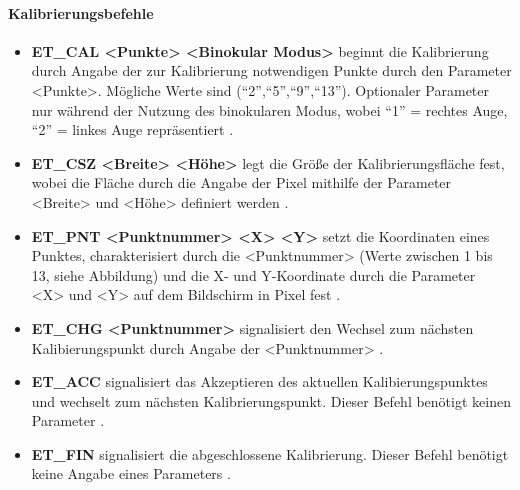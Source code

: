\paragraph{Kalibrierungsbefehle}
\begin{itemize}
\item \textbf{ET\_CAL <Punkte> <Binokular Modus>} beginnt die Kalibrierung durch Angabe der zur Kalibrierung notwendigen Punkte durch den Parameter <Punkte>. Mögliche Werte sind (\enquote{2},\enquote{5},\enquote{9},\enquote{13}). Optionaler Parameter nur während der Nutzung des binokularen Modus, wobei \enquote{1} = rechtes Auge, \enquote{2} = linkes Auge repräsentiert \cite[S.489-490]{SMI2011}.
\item \textbf{ET\_CSZ <Breite> <Höhe>} legt die Größe der Kalibrierungsfläche fest, wobei die Fläche durch die Angabe der Pixel mithilfe der Parameter <Breite> und <Höhe> definiert werden \cite[S.493-494]{SMI2011}.
\item \textbf{ET\_PNT <Punktnummer> <X> <Y>} setzt die Koordinaten eines Punktes, charakterisiert durch die <Punktnummer> (Werte zwischen 1 bis 13, siehe Abbildung) und die X- und Y-Koordinate durch die Parameter <X> und <Y> auf dem Bildschirm in Pixel fest \cite[S.503-504]{SMI2011}.
\item \textbf{ET\_CHG <Punktnummer>} signalisiert den Wechsel zum nächsten Kalibierungspunkt durch Angabe der <Punktnummer> \cite[S.490-491]{SMI2011}.
\item \textbf{ET\_ACC} signalisiert das Akzeptieren des aktuellen Kalibierungspunktes und wechselt zum nächsten Kalibrierungspunkt. Dieser Befehl benötigt keinen Parameter \cite[S.487]{SMI2011}.
\item \textbf{ET\_FIN} signalisiert die abgeschlossene Kalibrierung. Dieser Befehl benötigt keine Angabe eines Parameters \cite[S.497]{SMI2011}.
\end{itemize}
